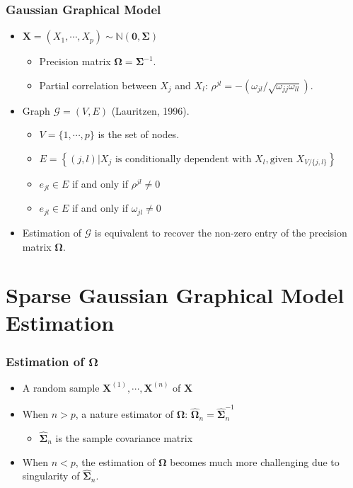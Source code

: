 \documentclass{beamer}
\newcommand{\N}{\mathbb N}
\newcommand{\bX}{\mathbf X}
\newcommand{\bOmega}{{\boldsymbol{\Omega}}}
\newcommand{\bSigma}{{\boldsymbol{\Sigma}}}
\begin{document}
\begin{frame}
\frametitle{Gaussian Graphical Model}
\begin{itemize}[<+->]
\item $\bX = (X_1, \cdots, X_p) \sim \N(\mathbf{0}, \bSigma)$
    \begin{itemize}
    \item Precision matrix $\bOmega = \bSigma^{-1}$.
    \item Partial correlation between $X_j$ and $X_l$: $\rho^{jl} = -(\omega_{jl}/\sqrt{\omega_{jj}\omega_{ll}})$. 
    \end{itemize}
\item Graph $\mathcal{G} = (V, E)$ (Lauritzen, 1996).
    \begin{itemize}
    \item $V = \{ 1, \cdots, p\}$ is the set of nodes.
    \item $E = \left\{ (j, l) | X_j \text{ is conditionally dependent with } X_l, \text{given } X_{V/\{j, l\}}\right\}$
    \item $e_{jl} \in E$ if and only if $\rho^{jl} \neq 0$
    \item $e_{jl} \in E$ if and only if $\omega_{jl} \neq 0$
    \end{itemize}    
\item Estimation of $\mathcal{G}$ is equivalent to recover the non-zero entry of the precision matrix $\bOmega$.   
\end{itemize}
\end{frame}




\section{Sparse Gaussian Graphical Model Estimation}


\begin{frame}
	\frametitle{Estimation of $\bOmega$}
	\begin{itemize}[<+->]
		\item A random sample $\bX^{(1)}, \cdots, \bX^{(n)}$ of $\bX$
		\item When $n > p$, a nature estimator of $\bOmega$: $\hat{\bOmega}_n = \hat{\bSigma}_n^{-1}$
		\begin{itemize}
			\item $\hat{\bSigma}_n$ is the sample covariance matrix
		\end{itemize}
		\item When $n < p$, the estimation of $\bOmega$ becomes much more challenging due to singularity of $\hat{\bSigma}_n$.
	\end{itemize}
	
\end{frame}
\end{document}

